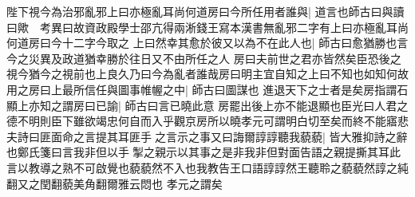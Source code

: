 陛下視今為治邪亂邪上曰亦極亂耳尚何道房曰今所任用者誰與|{
	道言也師古曰與讀曰歟　考異曰故資政殿學士邵亢得兩淅錢王寫本漢書無亂邪二字有上曰亦極亂耳尚何道房曰今十二字今取之}
上曰然幸其愈於彼又以為不在此人也|{
	師古曰愈猶勝也言今之災異及政道猶幸勝於往日又不由所任之人}
房曰夫前世之君亦皆然矣臣恐後之視今猶今之視前也上良久乃曰今為亂者誰哉房曰明主宜自知之上曰不知也如知何故用之房曰上最所信任與圖事帷幄之中|{
	師古曰圖謀也}
進退天下之士者是矣房指謂石顯上亦知之謂房曰已諭|{
	師古曰言已曉此意}
房罷出後上亦不能退顯也臣光曰人君之德不明則臣下雖欲竭忠何自而入乎觀京房所以曉孝元可謂明白切至矣而終不能寤悲夫詩曰匪面命之言提其耳匪手之言示之事又曰誨爾諄諄聽我藐藐|{
	皆大雅抑詩之辭也鄭氏箋曰言我非但以手掣之親示以其事之是非我非但對面告語之親提撕其耳此言以教導之熟不可啟覺也藐藐然不入也我教告王口語諄諄然王聽聆之藐藐然諄之純翻又之閏翻藐美角翻爾雅云悶也}
孝元之謂矣

